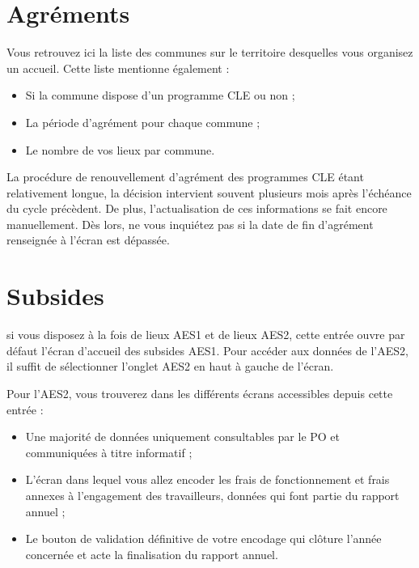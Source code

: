 \section{Agréments}

Vous retrouvez ici la liste des communes sur le territoire desquelles vous organisez un accueil.
Cette liste mentionne également :

\begin{itemize}
    \item Si la commune dispose d’un programme CLE ou non ;
    \item La période d’agrément pour chaque commune ;
    \item Le nombre de vos lieux par commune.
\end{itemize}

\begin{information}
La procédure de renouvellement d’agrément des programmes CLE étant relativement longue, la décision intervient souvent plusieurs mois après l’échéance du cycle précèdent. De plus, l’actualisation de ces informations se fait encore manuellement. Dès lors, ne vous inquiétez pas si la date de fin d’agrément renseignée à l’écran est dépassée.
\end{information}

\section{Subsides}\label{aes2_subsides}
\begin{remarque} si vous disposez à la fois de lieux AES1 et de lieux AES2, cette entrée ouvre par défaut l’écran d’accueil des subsides AES1. Pour accéder aux données de l’AES2, il suffit de sélectionner l’onglet AES2 en haut à gauche de l’écran.
\end{remarque}

Pour l’AES2, vous trouverez dans les différents écrans accessibles depuis cette entrée :
\begin{itemize}
    \item Une majorité de données uniquement consultables par le PO et communiquées à titre informatif ;
    \item L’écran dans lequel vous allez encoder les frais de fonctionnement et frais annexes à l’engagement des travailleurs, données qui font partie du rapport annuel ;
    \item Le bouton de validation définitive de votre encodage qui clôture l’année concernée et acte la finalisation du rapport annuel.    
\end{itemize}

